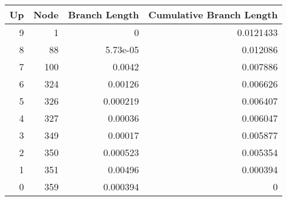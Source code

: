 \begin{tabular}{rrrr}
\hline
Up & Node & Branch Length & Cumulative Branch Length\\\hline
9 & 1 & 0 & 0.0121433\\
8 & 88 & 5.73e-05 & 0.012086\\
7 & 100 & 0.0042 & 0.007886\\
6 & 324 & 0.00126 & 0.006626\\
5 & 326 & 0.000219 & 0.006407\\
4 & 327 & 0.00036 & 0.006047\\
3 & 349 & 0.00017 & 0.005877\\
2 & 350 & 0.000523 & 0.005354\\
1 & 351 & 0.00496 & 0.000394\\
0 & 359 & 0.000394 & 0\\
\hline
\end{tabular}
